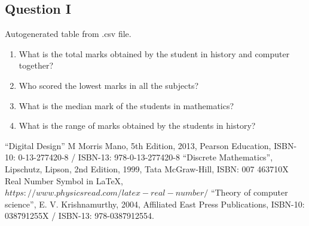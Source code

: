\documentclass{article}
\begin{document}
\subsection*{Question I}
\begin{table}[h]
  \begin{center}
    \caption{Autogenerated table from .csv file.}
    \label{table1}
  \end{center}
\end{table}
\begin{enumerate}
\item What is the total marks obtained by the student in history and computer together?
\item Who scored the lowest marks in all the subjects?
\item What is the median mark of the students in mathematics?
\item What is the range of marks obtained by the students in history?
\end{enumerate}
\pagebreak


\begin{thebibliography} {}
 “Digital Design” M Morris Mano, 5th Edition, 2013, Pearson Education, ISBN-10: 0-13-277420-8 / ISBN-13: 978-0-13-277420-8
 “Discrete Mathematics”, Lipschutz, Lipson, 2nd Edition, 1999, Tata McGraw-Hill, ISBN: 007 463710X
 Real Number Symbol in LaTeX, $https://www.physicsread.com/latex-real-number/$
“Theory of computer science”, E. V. Krishnamurthy, 2004, Affiliated East Press Publications, ISBN-10: 038791255X / ISBN-13: 978-0387912554.

\end{thebibliography}
\end{document}
